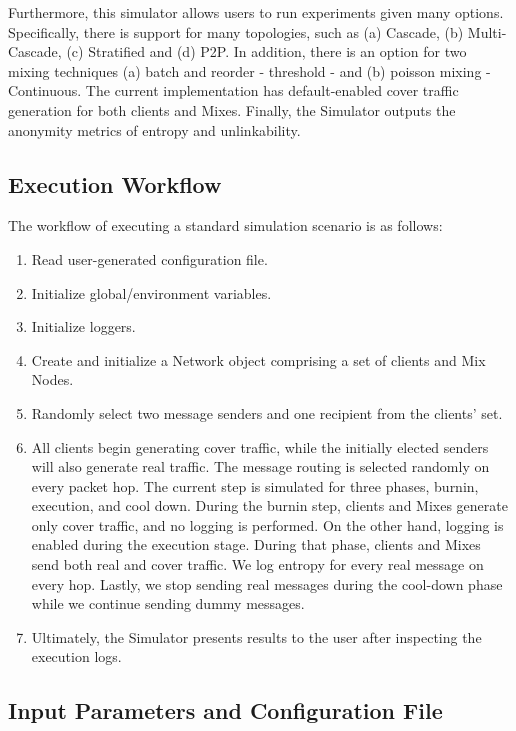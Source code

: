 \documentclass[logo,msc,cyber]{infthesis}   %
\begin{document}
Furthermore, this simulator allows users to run experiments given many options.
Specifically, there is support for many topologies, such as (a) Cascade, (b)
Multi-Cascade, (c) Stratified and (d) P2P. In addition, there is an option for two
mixing techniques (a) batch and reorder - threshold - and (b) poisson mixing
- Continuous. The current implementation has default-enabled cover traffic
generation for both clients and Mixes. Finally, the Simulator outputs the
anonymity metrics of entropy and unlinkability.

\subsection{Execution Workflow}

The workflow of executing a standard simulation scenario is as follows:

\begin{enumerate}
    \item Read user-generated configuration file.
    \item Initialize global/environment variables.
    \item Initialize loggers.
    \item Create and initialize a Network object comprising a set of clients and Mix Nodes.
    \item Randomly select two message senders and one recipient from the clients' set.
    \item All clients begin generating cover traffic, while the initially
    elected senders will also generate real traffic. The message routing is
    selected randomly on every packet hop. The current step is simulated for
    three phases, burnin, execution, and cool down. During the burnin step,
    clients and Mixes generate only cover traffic, and no logging is performed.
    On the other hand, logging is enabled during the execution stage. During
    that phase, clients and Mixes send both real and cover traffic. We log
    entropy for every real message on every hop. Lastly, we stop sending real
    messages during the cool-down phase while we continue sending dummy
    messages.
    \item Ultimately, the Simulator presents results to the user after
    inspecting the execution logs.
\end{enumerate}

\subsection{Input Parameters and Configuration File}
\end{document}
